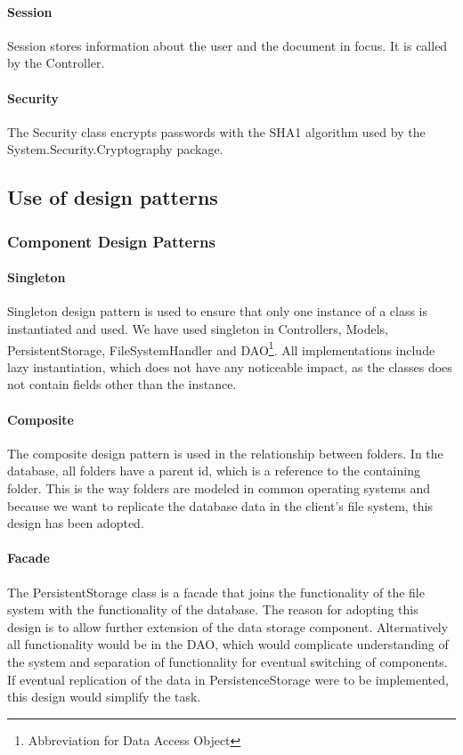 \documentclass[a4paper,11pt,report]{report}
\begin{document}
\paragraph{Session}
Session stores information about the user and the document in focus. It is called by the Controller.
\paragraph{Security}
The Security class encrypts passwords with the SHA1 algorithm used by the System.Security.Cryptography package.

\subsection{Use of design patterns}
\subsubsection{Component Design Patterns}
\paragraph{Singleton}
Singleton design pattern is used to ensure that only one instance of a class is instantiated and used. We have used singleton in Controllers, Models, PersistentStorage, FileSystemHandler and DAO\footnote[8]{Abbreviation for Data Access Object}. All implementations include lazy instantiation, which does not have any noticeable impact, as the classes does not contain fields other than the instance.
\paragraph {Composite}
The composite design pattern is used in the relationship between folders. In the database, all folders have a parent id, which is a reference to the containing folder. This is the way folders are modeled in common operating systems and because we want to replicate the database data in the client's file system, this design has been adopted.
\paragraph {Facade}
The PersistentStorage class is a facade that joins the functionality of the file system with the functionality of the database. The reason for adopting this design is to allow further extension of the data storage component. Alternatively all functionality would be in the DAO, which would complicate understanding of the system and separation of functionality for eventual switching of components. If eventual replication of the data in PersistenceStorage were to be implemented, this design would simplify the task.
\end{document}
